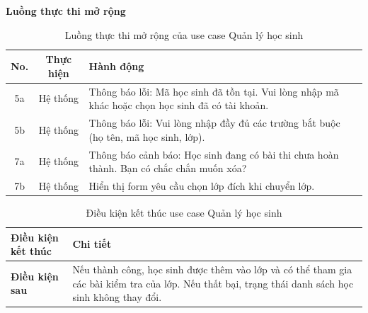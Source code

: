 ﻿\documentclass[../DoAn.tex]{subfiles}
\begin{document}
\noindent\textbf{Luồng thực thi mở rộng}
\begin{table}[H]
\centering
\begin{tabular}{|c|c|p{9cm}|}
\hline
\textbf{No.} & \textbf{Thực hiện} & \textbf{Hành động} \\ \hline
5a & Hệ thống & Thông báo lỗi: Mã học sinh đã tồn tại. Vui lòng nhập mã khác hoặc chọn học sinh đã có tài khoản. \\ \hline
5b & Hệ thống & Thông báo lỗi: Vui lòng nhập đầy đủ các trường bắt buộc (họ tên, mã học sinh, lớp). \\ \hline
7a & Hệ thống & Thông báo cảnh báo: Học sinh đang có bài thi chưa hoàn thành. Bạn có chắc chắn muốn xóa? \\ \hline
7b & Hệ thống & Hiển thị form yêu cầu chọn lớp đích khi chuyển lớp. \\ \hline
\end{tabular}
\caption{Luồng thực thi mở rộng của use case Quản lý học sinh}
\label{table:appendix:B.2_ext}
\end{table}
\begin{table}[H]
\centering
\begin{tabular}{|p{4cm}|p{10cm}|}
\hline
\textbf{Điều kiện kết thúc} & \textbf{Chi tiết} \\ \hline
\textbf{Điều kiện sau} & Nếu thành công, học sinh được thêm vào lớp và có thể tham gia các bài kiểm tra của lớp. Nếu thất bại, trạng thái danh sách học sinh không thay đổi. \\ \hline
\end{tabular}
\caption{Điều kiện kết thúc use case Quản lý học sinh}
\label{table:appendix:B.2_post}
\end{table}
\end{document}
